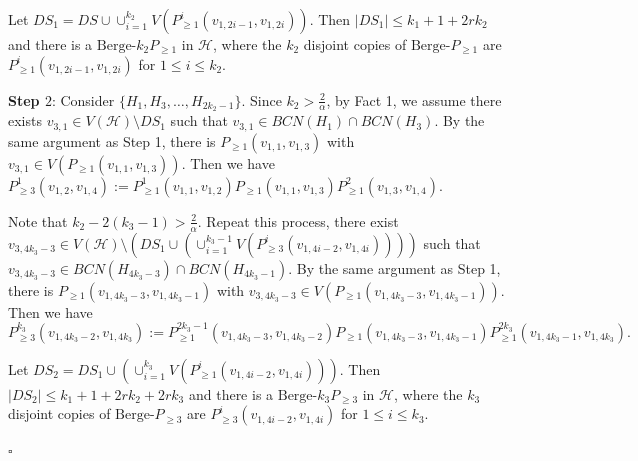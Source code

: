 \documentclass[12pt]{article}%
\newenvironment{proof}{{\noindent\it Proof.}}{\hfill $\square$\par}
\newcommand{\ber}{\text{Berge-}}
\newcommand{\mh}{\mathcal{H}}
\begin{document}
\begin{proof}
    Let $DS_1=DS\cup \cup_{i=1}^{k_2}V(P_{\ge 1}^{i}(v_{1,2i-1},v_{1,2i}))$. Then $|DS_1|\le k_1+1+2rk_2$ and there is  a $\ber k_2P_{\ge1}$ in $\mh$, where the $k_2$ disjoint copies of $\ber P_{\ge1}$ are $P_{\ge 1}^{i}(v_{1,2i-1},v_{1,2i})$ for $1\le i\le k_2$.

    \par\noindent
    \textbf{Step $2$}:
      Consider $\{H_{1},H_{3},\ldots,H_{2k_2-1}\}$. Since $k_2>\frac{2}{\alpha} $, by Fact 1, we assume there exists $v_{3,1}\in V(\mh)\setminus DS_1$ such that $v_{3,1}\in BCN(H_1)\cap BCN(H_3)$.
      By the same argument as Step 1, there is $P_{\ge 1}(v_{1,1},v_{1,3})$ with $ v_{3,1}\in V(P_{\ge 1}(v_{1,1},v_{1,3}))$. Then we have $P_{\ge 3}^1(v_{1,2},v_{1,4}):=P_{\ge1}^{1}(v_{1,1},v_{1,2})P_{\ge 1}(v_{1,1},v_{1,3})P_{\ge1}^{2}(v_{1,3},v_{1,4})$.

       Note that $k_2-2(k_3-1)>\frac{2}{\alpha}$. Repeat this process,   there exist $v_{3,4k_3-3}\in V(\mh)\setminus (DS_1\cup \left(\cup_{i=1}^{k_3-1}V(P_{\ge 3}^{i}(v_{1,4i-2},v_{1,4i}))\right))$ such that $v_{3,4k_3-3}\in BCN(H_{4k_3-3})\cap BCN(H_{4k_3-1})$. By the same argument as Step 1, there is $P_{\ge 1}(v_{1,4k_3-3},v_{1,4k_3-1})$ with $v_{3,4k_3-3}\in V(P_{\ge 1}(v_{1,4k_3-3},v_{1,4k_3-1}))$. Then we have $$P_{\ge 3}^{k_3}(v_{1,4k_3-2},v_{1,4k_3}):=P_{\ge 1}^{2k_3-1}(v_{1,4k_3-3},v_{1,4k_3-2})P_{\ge 1}(v_{1,4k_3-3},v_{1,4k_3-1})P_{\ge 1}^{2k_3}(v_{1,4k_3-1},v_{1,4k_3}).$$
          \par
     Let $DS_2=DS_1\cup \left(\cup_{i=1}^{k_3}V(P_{\ge 1}^{i}(v_{1,4i-2},v_{1,4i}))\right)$. Then $|DS_2|\le k_1+1+2rk_2+2rk_3$ and there is  a $\ber k_3P_{\ge3}$ in $\mh$, where the $k_3$ disjoint copies of $\ber P_{\ge3}$ are $P_{\ge 3}^{i}(v_{1,4i-2},v_{1,4i})$ for $1\le i\le k_3$.


\end{proof}
\end{document}
